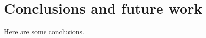 \documentclass[10pt,twocolumn,letterpaper]{article}
\begin{document}
\section{Conclusions and future work}
Here are some conclusions.

{\small
%


}
\end{document}
